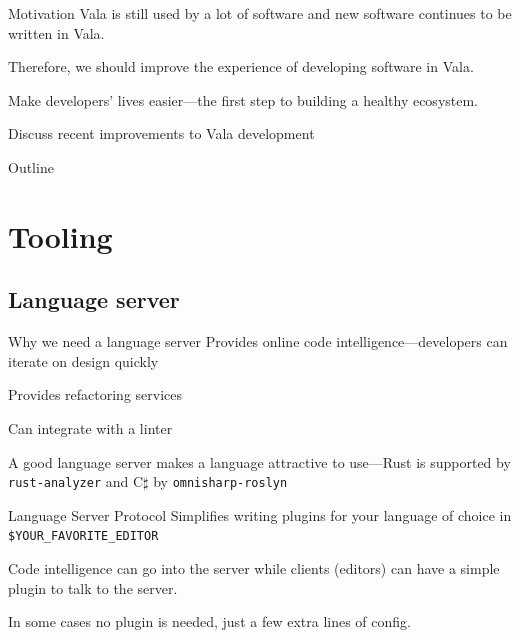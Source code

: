 \documentclass[t]{beamer}
\begin{document}
\begin{frame}[c]{Motivation}
Vala is still used by a lot of software and new software continues to be written in Vala.

Therefore, we should improve the experience of developing software in Vala.

Make developers' lives easier---the first step to building a healthy ecosystem. \pause

Discuss recent improvements to Vala development
\end{frame}

\begin{frame}[c]{Outline}
\vspace{12pt}
\tableofcontents
\end{frame}

\section{Tooling}
\subsection{Language server}
\begin{frame}[c]{Why we need a language server}
Provides online code intelligence---developers can iterate on design quickly

Provides refactoring services

Can integrate with a linter

A good language server makes a language attractive to use---Rust is supported by \texttt{rust-analyzer} and C$\sharp$ by \texttt{omnisharp-roslyn}
\end{frame}

\begin{frame}[c]{Language Server Protocol}
Simplifies writing plugins for your language of choice in \texttt{\$YOUR\_FAVORITE\_EDITOR}

Code intelligence can go into the server while clients (editors) can have a simple plugin to talk to the server.

In some cases no plugin is needed, just a few extra lines of config.
\end{frame}
\end{document}
